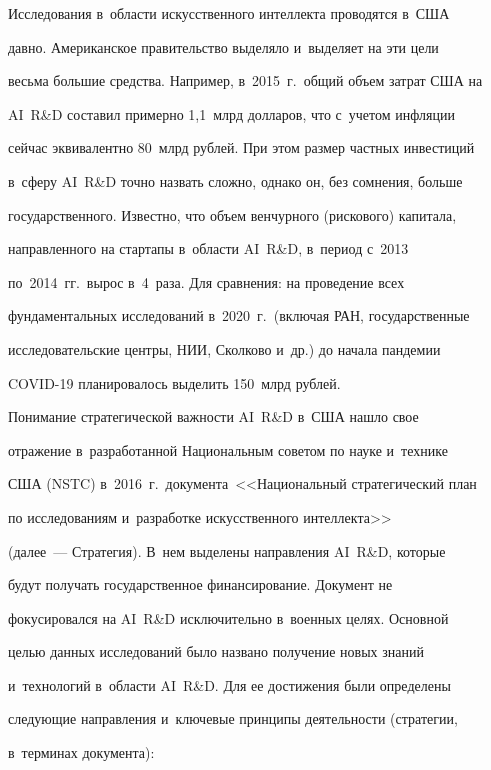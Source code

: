  Исследования в~об\-ласти искусственного интеллекта проводятся в~США


дав\-но. Американское правительство выделяло и~выделяет на эти цели


весьма большие средства. Например, в~2015~г.\ общий объем затрат США на


AI~R\&D составил примерно 1,1~млрд долларов, что с~учетом инфляции


сейчас эквивалентно 80~млрд рублей. При этом размер частных инвестиций


в~сферу AI~R\&D точно назвать сложно, однако он, без сомнения, больше


государственного. Известно, что объем венчурного (рискового) капитала,


направленного на стартапы в~об\-ласти AI~R\&D, в~период с~2013


по~2014~гг.\ вырос в~4~раза. Для сравнения: на проведение всех


фундаментальных исследований в~2020~г.\ (включая РАН, государственные


исследовательские центры, НИИ, Сколково и~др.) до начала пандемии


COVID-19 планировалось выделить 150~млрд рублей.





  Понимание стратегической важности AI~R\&D в~США нашло свое


отражение в~разработанной Национальным советом по науке и~технике


США (NSTC) в~2016~г.\ документа~<<Национальный стратегический план


по исследованиям и~разработке искусственного интеллекта>>~\cite{4-bor}


(далее~--- Стратегия). В~нем выделены на\-прав\-ле\-ния AI~R\&D, которые


будут получать государственное финансирование. Документ не


фокусировался на AI~R\&D исключительно в~военных целях. Основной


целью данных исследований было названо получение новых знаний


и~технологий в~об\-ласти AI~R\&D. Для ее достижения были определены


сле\-ду\-ющие на\-прав\-ле\-ния и~ключевые принципы деятельности (стратегии,


в~терминах документа):





